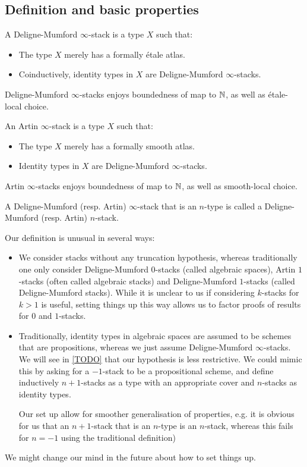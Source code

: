 \subsection{Definition and basic properties}

\begin{definition}
A Deligne-Mumford $\infty$-stack is a type $X$ such that:
\begin{itemize}
\item The type $X$ merely has a formally étale atlas. 
\item Coinductively, identity types in $X$ are Deligne-Mumford $\infty$-stacks.
\end{itemize}
\end{definition}

Deligne-Mumford $\infty$-stacks enjoys boundedness of map to $\mathbb{N}$, as well as étale-local choice.

\begin{definition}
An Artin $\infty$-stack is a type $X$ such that:
\begin{itemize}
\item The type $X$ merely has a formally smooth atlas. 
\item Identity types in $X$ are Deligne-Mumford $\infty$-stacks.
\end{itemize}
\end{definition}

Artin $\infty$-stacks enjoys boundedness of map to $\mathbb{N}$, as well as smooth-local choice.

\begin{definition}
A Deligne-Mumford (resp. Artin) $\infty$-stack that is an $n$-type is called a Deligne-Mumford (resp. Artin) $n$-stack.
\end{definition}

\begin{remark}
Our definition is unusual in several ways:
\begin{itemize}
\item We consider stacks without any truncation hypothesis, whereas traditionally one only consider Deligne-Mumford $0$-stacks (called algebraic spaces), Artin $1$-stacks (often called algebraic stacks) and Deligne-Mumford $1$-stacks (called Deligne-Mumford stacks). While it is unclear to us if considering $k$-stacks for $k>1$ is useful, setting things up this way allows us to factor proofs of results for $0$ and $1$-stacks.
\item Traditionally, identity types in algebraic spaces are assumed to be schemes that are propositions, whereas we just assume Deligne-Mumford $\infty$-stacks. We will see in \cref{TODO} that our hypothesis is less restrictive. We could mimic this by asking for a $-1$-stack to be a propositional scheme, and define inductively $n+1$-stacks as a type with an appropriate cover and $n$-stacks as identity types.

Our set up allow for smoother generalisation of properties, e.g. it is obvious for us that an $n+1$-stack that is an $n$-type is an $n$-stack, whereas this fails for $n=-1$ using the traditional definition)
\end{itemize}
We might change our mind in the future about how to set things up.
\end{remark}

